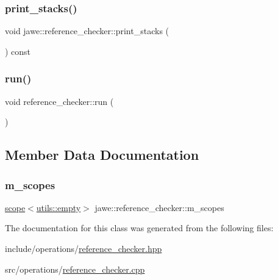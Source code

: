 \subsubsection{\texorpdfstring{print\+\_\+stacks()}{print\_stacks()}}
{\footnotesize\ttfamily void jawe\+::reference\+\_\+checker\+::print\+\_\+stacks (\begin{DoxyParamCaption}{ }\end{DoxyParamCaption}) const\hspace{0.3cm}{\ttfamily [private]}}

\mbox{\label{classjawe_1_1reference__checker_a6bb75b8f955c552fc41bc2515e98b502}} 
\subsubsection{\texorpdfstring{run()}{run()}}
{\footnotesize\ttfamily void reference\+\_\+checker\+::run (\begin{DoxyParamCaption}{ }\end{DoxyParamCaption})}



\subsection{Member Data Documentation}
\mbox{\label{classjawe_1_1reference__checker_ab5f261a23048b85922486b7f7a2960a8}} 
\subsubsection{\texorpdfstring{m\+\_\+scopes}{m\_scopes}}
{\footnotesize\ttfamily \hyperlink{classjawe_1_1utils_1_1scope}{scope}$<$\hyperlink{classjawe_1_1utils_1_1empty}{utils\+::empty}$>$ jawe\+::reference\+\_\+checker\+::m\+\_\+scopes\hspace{0.3cm}{\ttfamily [private]}}



The documentation for this class was generated from the following files\+:\begin{DoxyCompactItemize}
\item 
include/operations/\hyperlink{reference__checker_8hpp}{reference\+\_\+checker.\+hpp}\item 
src/operations/\hyperlink{reference__checker_8cpp}{reference\+\_\+checker.\+cpp}\end{DoxyCompactItemize}
